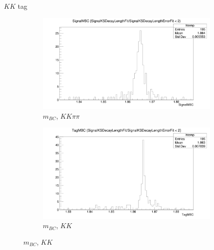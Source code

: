 \documentclass{beamer}
\begin{document}
\begin{frame}{$KK$ tag}
  \begin{figure}
    \centering
    \begin{subfigure}{0.5\textwidth}
      \centering
      \includegraphics[width=\textwidth]{KKDoubleTag_SignalMBC.png}
      \caption{$m_{BC}$, $KK\pi\pi$}
    \end{subfigure}%
    \begin{subfigure}{0.5\textwidth}
      \centering
      \includegraphics[width=\textwidth]{KKDoubleTag_TagMBC.png}
      \caption{$m_{BC}$, $KK$}
    \end{subfigure}
  \end{figure}
\end{frame}
\end{document}
